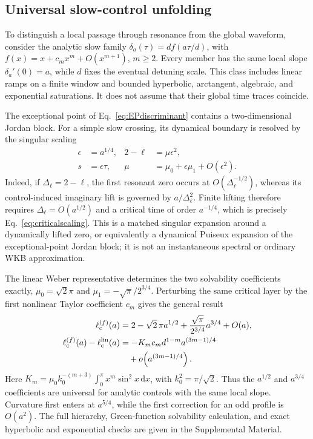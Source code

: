 \documentclass[reprint,superscriptaddress,floatfix,amsmath,amssymb,prresearch,aps]{revtex4-2}
\newcommand{\dd}{\mathrm{d}}
\begin{document}
\subsection{Universal slow-control unfolding}
\label{subsec:slowsweep}

To distinguish a local passage through resonance from the global waveform,
consider the analytic slow family
\(\delta_a(\tau)=d f(a\tau/d)\), with
\(f(x)=x+c_mx^m+O(x^{m+1})\), \(m\geq2\). Every member has the same local
slope \(\delta_a'(0)=a\), while \(d\) fixes the eventual detuning scale.
This class includes linear ramps on a finite window and bounded hyperbolic,
arctangent, algebraic, and exponential saturations. It does not assume that
their global time traces coincide.

The exceptional point of Eq.~\eqref{eq:EPdiscriminant} contains a
two-dimensional Jordan block. For a simple slow crossing, its dynamical
boundary is resolved by the singular scaling
\begin{equation}
\begin{aligned}
\epsilon&=a^{1/4},&
2-\ell&=\mu\epsilon^2,\\
s&=\epsilon\tau,&
\mu&=\mu_0+\epsilon\mu_1+O(\epsilon^2).
\end{aligned}
\label{eq:criticalscaling}
\end{equation}
Indeed, if \(\Delta_\ell=2-\ell\), the first resonant zero occurs at
\(O(\Delta_\ell^{-1/2})\), whereas its control-induced imaginary lift is
governed by \(a/\Delta_\ell^2\). Finite lifting therefore requires
\(\Delta_\ell=O(a^{1/2})\) and a critical time of order \(a^{-1/4}\), which
is precisely Eq.~\eqref{eq:criticalscaling}. This is a matched singular
expansion around a dynamically lifted zero, or equivalently a dynamical
Puiseux expansion of the exceptional-point Jordan block; it is not an
instantaneous spectral or ordinary WKB approximation.

The linear Weber representative determines the two solvability coefficients
exactly, \(\mu_0=\sqrt2\pi\) and
\(\mu_1=-\sqrt\pi/2^{3/4}\). Perturbing the same critical layer by the first
nonlinear Taylor coefficient \(c_m\) gives the general result
\begin{equation}
\begin{aligned}
\ell_{\rm c}^{(f)}(a)
&=2-\sqrt2\,\pi a^{1/2}
+\frac{\sqrt\pi}{2^{3/4}}a^{3/4}+O(a),\\
\ell_{\rm c}^{(f)}(a)-\ell_{\rm c}^{\rm lin}(a)
&=-K_m c_m d^{1-m}a^{(3m-1)/4}\\
&\quad+o\!\left(a^{(3m-1)/4}\right).
\end{aligned}
\label{eq:mainboundary}
\end{equation}
Here
\(K_m=\mu_0k_0^{-(m+3)}\int_0^\pi x^m\sin^2x\,\dd x\), with
\(k_0^2=\pi/\sqrt2\). Thus the \(a^{1/2}\) and \(a^{3/4}\) coefficients
are universal for analytic controls with the same local slope. Curvature
first enters at \(a^{5/4}\), while the first correction for an odd profile
is \(O(a^2)\). The full hierarchy, Green-function solvability calculation,
and exact hyperbolic and exponential checks are given in the Supplemental
Material.
\end{document}
